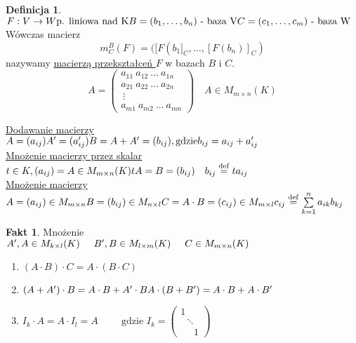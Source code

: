 \documentclass[12pt,a4paper]{article}
\theoremstyle{plain}
\theoremstyle{definition}
\newtheorem{ft}{Fakt}[section]
\theoremstyle{definition}
\newtheorem{df}{Definicja}[section]
\theoremstyle{definition}
\theoremstyle{definition}
\theoremstyle{definition}
\theoremstyle{definition}
\theoremstyle{definition}
\theoremstyle{definition}
\theoremstyle{definition}
\begin{document}
\begin{df} 
    $ 
        F: V \rightarrow W \text{p. liniowa nad K} \\
        B = (b_1,\dots,b_n) \text{ - baza V} \\
        C = (c_1, \dots,c_m) \text{ - baza W} \\
    $
    Wówczas macierz \\
        $$m^B_C (F) = ([F(b_1]_C,\dots,[F(b_n)]_C)$$ nazywamy \underline{macierzą przekształceń $F$} w bazach $B$ i $C$. 
    $$ A = \begin{pmatrix} a_{11} \ a_{12} \ \dots \ a_{1n} \\
                           a_{21} \ a_{22} \ \dots \ a_{2n} \\
                                   \        \vdots \  \\
                           a_{m1} \ a_{m2} \ \dots \ a_{mn}
    \end{pmatrix} \quad A \in M_{m \times n} (K)$$
\end{df}
\noindent 
\underline{Dodawanie macierzy} \\
$ 
  A = (a_{ij}) \\
  A' =(a'_{ij}) \\ 
  B = A + A' = (b_{ij}), \text{gdzie} b_{ij} = a_{ij} + a'_{ij}
$ \\
\underline{Mnożenie macierzy przez skalar} \\ 
$ 
    t \in K, (a_{ij}) = A \in M_{m \times n}(K) \\
    tA = B = (b_{ij}) \quad b_{ij} \overset{\mathrm{def}}{=} t a_{ij}
$ \\
\underline{Mnożenie macierzy} \\ 
$
    A = (a_{ij}) \in M_{m \times n} \\
    B = (b_{ij}) \in M_{n \times l} \\ 
    C = A \cdot B = (c_{ij}) \in M_{m \times l} \\
    c_{ij} \overset{\mathrm{def}}{=} \sum\limits_{k=1}^n a_{ik}b_{kj}
$
\begin{ft}
    Mnożenie \\
    $A', A \in M_{k \times l} (K) \hspace{0.5cm} B', B \in M_{l \times m} (K) \hspace{0.5cm} C \in M_{m \times n} (K)$
    \begin{enumerate}[{(}1{)}]
        \item $ (A \cdot B) \cdot C = A \cdot (B \cdot C)$
        \item $ (A + A') \cdot B = A \cdot B + A' \cdot B \\
            A \cdot (B + B') = A \cdot B + A \cdot B' $
        \item $ I_k \cdot A = A  \cdot I_l = A  \hspace{1cm} \text{gdzie } I_k = \begin{pmatrix} 
                1 \\ ~~  \ \ddots \  \\ ~~ \ ~~  \ 1
            \end{pmatrix} $
    \end{enumerate}
\end{ft}
\end{document}
